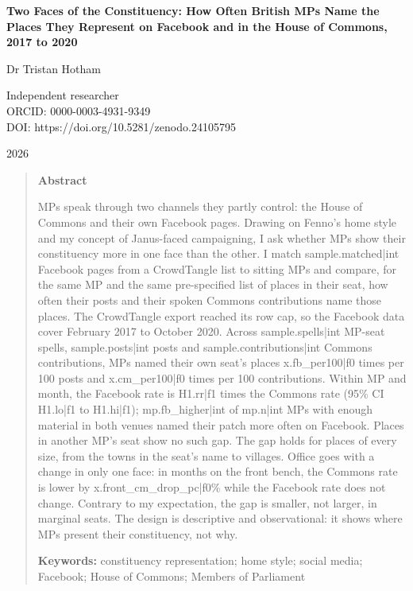 \documentclass[11pt,a4paper]{article}
\begin{document}
\begin{center}
{\Large\bfseries Two Faces of the Constituency: How Often British MPs Name the Places They Represent on Facebook and in the House of Commons, 2017 to 2020\par}
\vspace{1.2em}
{\large Dr Tristan Hotham\par}
\vspace{0.3em}
{\small Independent researcher\\
ORCID: 0000-0003-4931-9349\\
DOI: https://doi.org/10.5281/zenodo.24105795\par}
\vspace{0.8em}
2026
\end{center}

\begin{quote}
\small
\begin{center}\textbf{Abstract}\end{center}
MPs speak through two channels they partly control: the House of Commons and their own Facebook pages. Drawing on Fenno's home style and my concept of Janus-faced campaigning, I ask whether MPs show their constituency more in one face than the other. I match {{sample.matched|int}} Facebook pages from a CrowdTangle list to sitting MPs and compare, for the same MP and the same pre-specified list of places in their seat, how often their posts and their spoken Commons contributions name those places. The CrowdTangle export reached its row cap, so the Facebook data cover February 2017 to October 2020. Across {{sample.spells|int}} MP-seat spells, {{sample.posts|int}} posts and {{sample.contributions|int}} Commons contributions, MPs named their own seat's places {{x.fb_per100|f0}} times per 100 posts and {{x.cm_per100|f0}} times per 100 contributions. Within MP and month, the Facebook rate is {{H1.rr|f1}} times the Commons rate (95\% CI {{H1.lo|f1}} to {{H1.hi|f1}}); {{mp.fb_higher|int}} of {{mp.n|int}} MPs with enough material in both venues named their patch more often on Facebook. Places in another MP's seat show no such gap. The gap holds for places of every size, from the towns in the seat's name to villages. Office goes with a change in only one face: in months on the front bench, the Commons rate is lower by {{x.front_cm_drop_pc|f0}}\% while the Facebook rate does not change. Contrary to my expectation, the gap is smaller, not larger, in marginal seats. The design is descriptive and observational: it shows where MPs present their constituency, not why.

\textbf{Keywords:} constituency representation; home style; social media; Facebook; House of Commons; Members of Parliament
\end{quote}
\end{document}
